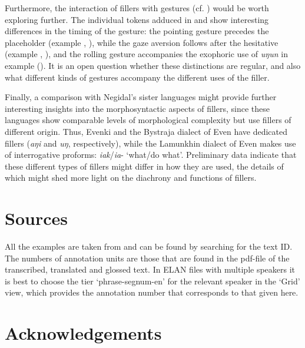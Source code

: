 \documentclass[output=paper]{langscibook}
\begin{document}
Furthermore, the interaction of fillers with gestures (cf. \citealt{Navaretta2015}) would be worth exploring further. The individual tokens adduced in  and  show interesting differences in the timing of the gesture: the pointing gesture precedes the placeholder (example , ), while the gaze aversion follows after the hesitative (example , ), and the rolling gesture accompanies the exophoric use of \textit{uŋun} in example  (). It is an open question whether these distinctions are regular, and also what different kinds of gestures accompany the different uses of the filler. 

Finally, a comparison with Negidal’s sister languages might provide further interesting insights into the morphosyntactic aspects of fillers, since these languages show comparable levels of morphological complexity but use fillers of different origin. Thus, Evenki \citep{Klyachko2022} and the Bystraja dialect of Even \citep{Matić2008} have dedicated fillers (\textit{aŋi} and \textit{uŋ}, respectively), while the Lamunkhin dialect of Even makes use of interrogative proforms: \textit{iak}/\textit{ia}{}- ‘what/do what’. Preliminary data indicate that these different types of fillers might differ in how they are used, the details of which might shed more light on the diachrony and functions of fillers. 

\section*{Sources}

All the examples are taken from \citet{PakendorfAralova2017} and can be found by searching for the text ID. The numbers of annotation units are those that are found in the pdf-file of the transcribed, translated and glossed text. In ELAN files with multiple speakers it is best to choose the tier ‘phrase-segnum-en’ for the relevant speaker in the ‘Grid’ view, which provides the annotation number that corresponds to that given here.

\section*{Acknowledgements}
\end{document}

